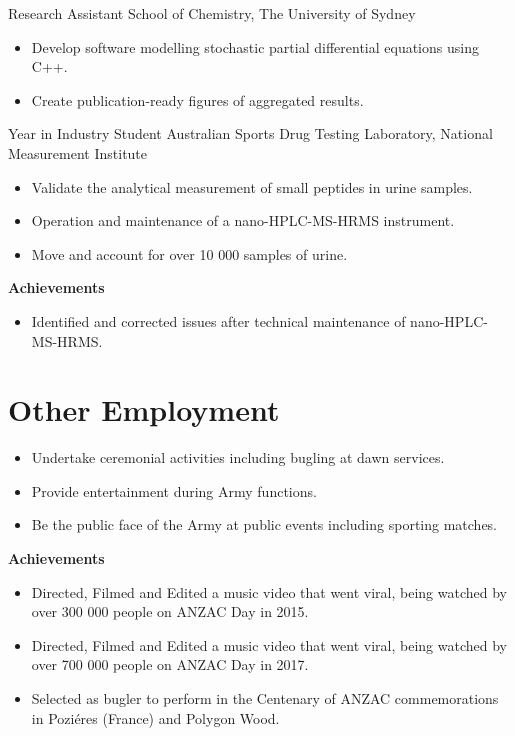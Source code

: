 {Research Assistant}
{School of Chemistry, The University of Sydney}
{}{}{%
  \begin{itemize}
    \item Develop software modelling stochastic partial differential equations using C++.
    \item Create publication-ready figures of aggregated results.
  \end{itemize}
}
\vspace{1em}

{Year in Industry Student}
{Australian Sports Drug Testing Laboratory, National Measurement Institute}
{}{}
{%
  \begin{itemize}
    \item Validate the analytical measurement of small peptides in urine samples.
    \item Operation and maintenance of a nano-HPLC-MS-HRMS instrument.
    \item Move and account for over 10 000 samples of urine.
  \end{itemize}
  \textbf{Achievements}
  \begin{itemize}
    \item Identified and corrected issues after technical maintenance of nano-HPLC-MS-HRMS.
  \end{itemize}
}
\vspace{1em}

\section{Other Employment}

{}{}
{%
\begin{itemize}
  \item Undertake ceremonial activities including bugling at dawn services.
  \item Provide entertainment during Army functions.
  \item Be the public face of the Army at public events including sporting matches.
\end{itemize}
\textbf{Achievements}
\begin{itemize}
  \item Directed, Filmed and Edited a music video  that went viral, being watched by over 300 000 people on ANZAC Day in 2015.
  \item Directed, Filmed and Edited a music video  that went viral, being watched by over 700 000 people on ANZAC Day in 2017.
  \item Selected as bugler to perform in the Centenary of ANZAC commemorations in Poziéres (France) and Polygon Wood.
\end{itemize}
}
\vspace{1em}

